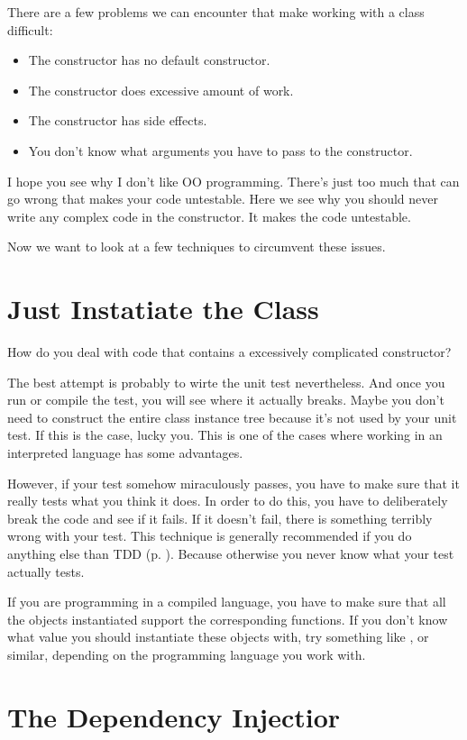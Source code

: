 There are a few problems we can encounter that make working with a class difficult:
\begin{itemize}
    \item The constructor has no default constructor.
    \item The constructor does excessive amount of work.
    \item The constructor has side effects.
    \item You don't know what arguments you have to pass to the constructor.
\end{itemize}
I hope you see why I don't like OO programming. There's just too much that can go wrong that makes your code untestable. Here we see why you should never write any complex code in the constructor. It makes the code untestable.

Now we want to look at a few techniques to circumvent these issues.

\section{Just Instatiate the Class}

How do you deal with code that contains a excessively complicated constructor?

The best attempt is probably to wirte the unit test nevertheless. And once you run or compile the test, you will see where it actually breaks. Maybe you don't need to construct the entire class instance tree because it's not used by your unit test. If this is the case, lucky you. This is one of the cases where working in an interpreted language has some advantages.

However, if your test somehow miraculously passes, you have to make sure that it really tests what you think it does. In order to do this, you have to deliberately break the code and see if it fails. If it doesn't fail, there is something terribly wrong with your test. This technique is generally recommended if you do anything else than TDD (p. \pageref{chap:tdd}). Because otherwise you never know what your test actually tests.

If you are programming in a compiled language, you have to make sure that all the objects instantiated support the corresponding functions. If you don't know what value you should instantiate these objects with, try something like ,  or similar, depending on the programming language you work with.

\section{The Dependency Injectior}

